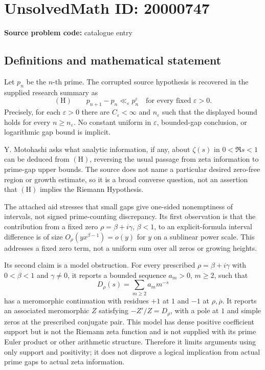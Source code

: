 \documentclass[11pt]{article}
\begin{document}
\section*{UnsolvedMath ID: 20000747}
\textbf{Source problem code:} catalogue entry
\subsection{Definitions and mathematical statement}
Let \(p_n\) be the \(n\)-th prime. The corrupted source hypothesis is recovered in the supplied research summary as
\[
(\mathrm H)\qquad p_{n+1}-p_n\ll_\varepsilon p_n^\varepsilon
\quad\text{for every fixed }\varepsilon>0.
\]
Precisely, for each \(\varepsilon>0\) there are \(C_\varepsilon<\infty\) and \(n_\varepsilon\) such that the displayed bound holds for every \(n\geq n_\varepsilon\). No constant uniform in \(\varepsilon\), bounded-gap conclusion, or logarithmic gap bound is implicit.

Y. Motohashi asks what analytic information, if any, about \(\zeta(s)\) in \(0<\Re s<1\) can be deduced from \((\mathrm H)\), reversing the usual passage from zeta information to prime-gap upper bounds. The source does not name a particular desired zero-free region or growth estimate, so it is a broad converse question, not an assertion that \((\mathrm H)\) implies the Riemann Hypothesis.

The attached aid stresses that small gaps give one-sided nonemptiness of intervals, not signed prime-counting discrepancy. Its first observation is that the contribution from a fixed zero \(\rho=\beta+i\gamma\), \(\beta<1\), to an explicit-formula interval difference is of size \(O_\rho(yx^{\beta-1})=o(y)\) for \(y\) on a sublinear power scale. This addresses a fixed zero term, not a uniform sum over all zeros or growing heights.

Its second claim is a model obstruction. For every prescribed \(\rho=\beta+i\gamma\) with \(0<\beta<1\) and \(\gamma\ne0\), it reports a bounded sequence \(a_m>0\), \(m\geq2\), such that
\[
D_\rho(s)=\sum_{m\geq2}a_m m^{-s}
\]
has a meromorphic continuation with residues \(+1\) at \(1\) and \(-1\) at \(\rho,\overline\rho\). It reports an associated meromorphic \(Z\) satisfying \(-Z'/Z=D_\rho\), with a pole at \(1\) and simple zeros at the prescribed conjugate pair. This model has dense positive coefficient support but is not the Riemann zeta function and is not supplied with its prime Euler product or other arithmetic structure. Therefore it limits arguments using only support and positivity; it does not disprove a logical implication from actual prime gaps to actual zeta information.
\end{document}

